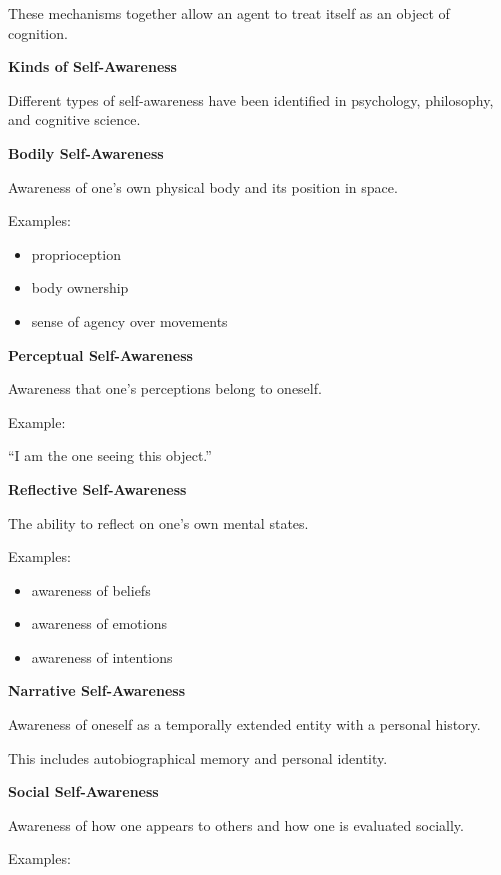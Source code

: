 \documentclass{book}
\providecommand{\ProjectDeepHeading}[2]{%
    \par\medskip\noindent\textbf{#2}\par\smallskip
}
\begin{document}
      These mechanisms together allow an agent to treat itself as an object of cognition.


   \ProjectDeepHeading{7}{Kinds of Self-Awareness}

      Different types of self-awareness have been identified in psychology, philosophy, and cognitive science.

      \ProjectDeepHeading{8}{Bodily Self-Awareness}

         Awareness of one's own physical body and its position in space.

         Examples:
         \begin{itemize}
            \item proprioception
            \item body ownership
            \item sense of agency over movements
         \end{itemize}

      \ProjectDeepHeading{8}{Perceptual Self-Awareness}

         Awareness that one's perceptions belong to oneself.

         Example:

         ``I am the one seeing this object.''

      \ProjectDeepHeading{8}{Reflective Self-Awareness}

         The ability to reflect on one's own mental states.

         Examples:

         \begin{itemize}
            \item awareness of beliefs
            \item awareness of emotions
            \item awareness of intentions
         \end{itemize}

      \ProjectDeepHeading{8}{Narrative Self-Awareness}

         Awareness of oneself as a temporally extended entity with a personal history.

         This includes autobiographical memory and personal identity.

      \ProjectDeepHeading{8}{Social Self-Awareness}

         Awareness of how one appears to others and how one is evaluated socially.

         Examples:
\end{document}
